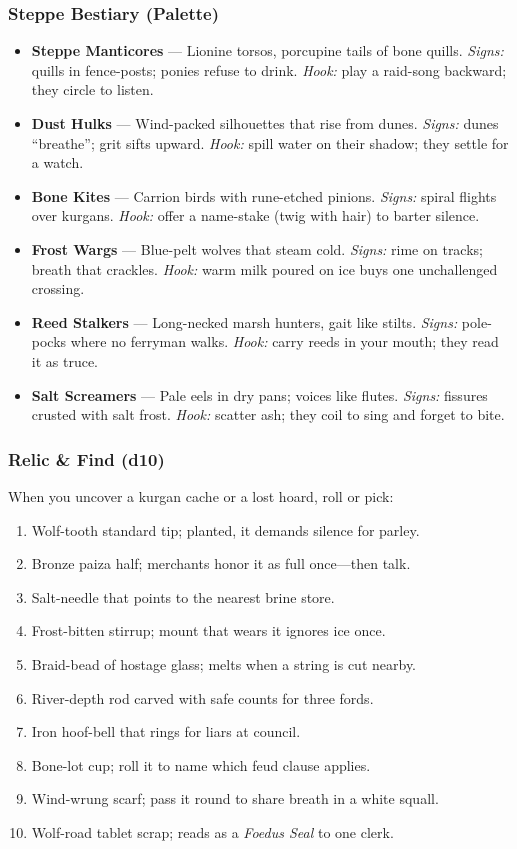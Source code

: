 \subsubsection{Steppe Bestiary (Palette)}
\label{sec:ykrul-bestiary}
\begin{itemize}[nosep]
  \item \textbf{Steppe Manticores} --- Lionine torsos, porcupine tails of bone quills. \emph{Signs:} quills in fence-posts; ponies refuse to drink. \emph{Hook:} play a raid-song backward; they circle to listen.
  \item \textbf{Dust Hulks} --- Wind-packed silhouettes that rise from dunes. \emph{Signs:} dunes ``breathe''; grit sifts upward. \emph{Hook:} spill water on their shadow; they settle for a watch.
  \item \textbf{Bone Kites} --- Carrion birds with rune-etched pinions. \emph{Signs:} spiral flights over kurgans. \emph{Hook:} offer a name-stake (twig with hair) to barter silence.
  \item \textbf{Frost Wargs} --- Blue-pelt wolves that steam cold. \emph{Signs:} rime on tracks; breath that crackles. \emph{Hook:} warm milk poured on ice buys one unchallenged crossing.
  \item \textbf{Reed Stalkers} --- Long-necked marsh hunters, gait like stilts. \emph{Signs:} pole-pocks where no ferryman walks. \emph{Hook:} carry reeds in your mouth; they read it as truce.
  \item \textbf{Salt Screamers} --- Pale eels in dry pans; voices like flutes. \emph{Signs:} fissures crusted with salt frost. \emph{Hook:} scatter ash; they coil to sing and forget to bite.
\end{itemize}

\subsubsection{Relic \& Find (d10)}
\label{sec:ykrul-relic-find}
When you uncover a kurgan cache or a lost hoard, roll or pick:
\begin{enumerate}
  \item Wolf-tooth standard tip; planted, it demands silence for parley.
  \item Bronze paiza half; merchants honor it as full once---then talk.
  \item Salt-needle that points to the nearest brine store.
  \item Frost-bitten stirrup; mount that wears it ignores ice once.
  \item Braid-bead of hostage glass; melts when a string is cut nearby.
  \item River-depth rod carved with safe counts for three fords.
  \item Iron hoof-bell that rings for liars at council.
  \item Bone-lot cup; roll it to name which feud clause applies.
  \item Wind-wrung scarf; pass it round to share breath in a white squall.
  \item Wolf-road tablet scrap; reads as a \emph{Foedus Seal} to one clerk.
\end{enumerate}


